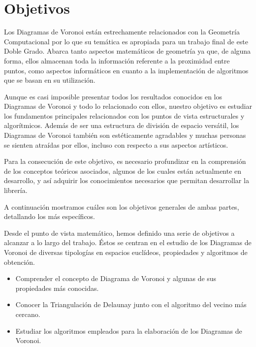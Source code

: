 \chapter{Objetivos}

Los Diagramas de Voronoi están estrechamente relacionados con la Geometría Computacional por lo que su temática es apropiada para un trabajo final de este Doble Grado. Abarca tanto aspectos matemáticos de geometría ya que, de alguna forma, ellos almacenan toda la información referente a la proximidad entre puntos, como aspectos informáticos en cuanto a la implementación de algoritmos que se basan en su utilización.

Aunque es casi imposible presentar todos los resultados conocidos en los Diagramas de Voronoi y todo lo relacionado con ellos, nuestro objetivo es estudiar los fundamentos principales relacionados con los puntos de vista estructurales y algorítmicos. Además de ser una estructura de división de espacio versátil, los Diagramas de Voronoi también son estéticamente agradables y muchas personas se sienten atraídas por ellos, incluso con respecto a sus aspectos artísticos.

Para la consecución de este objetivo, es necesario profundizar en la comprensión de los conceptos teóricos asociados, algunos de los cuales están actualmente en desarrollo, y así adquirir los conocimientos necesarios que permitan desarrollar la librería.

A continuación mostramos cuáles son los objetivos generales de ambas partes, detallando los más específicos.

\vspace{0.5cm}
 
Desde el punto de vista matemático, hemos definido una serie de objetivos a alcanzar a lo largo del trabajo. Éstos se centran en el estudio de los Diagramas de Voronoi de diversas tipologías en espacios euclídeos, propiedades y algoritmos de obtención.
\begin{itemize}
	\item[{\ding{80}}] Comprender el concepto de Diagrama de Voronoi y algunas de sus propiedades más conocidas.
	\item[{\ding{80}}] Conocer la Triangulación de Delaunay junto con el algoritmo del vecino más cercano.
	\item[{\ding{80}}] Estudiar los algoritmos empleados para la elaboración de los Diagramas de Voronoi.  
\end{itemize}

